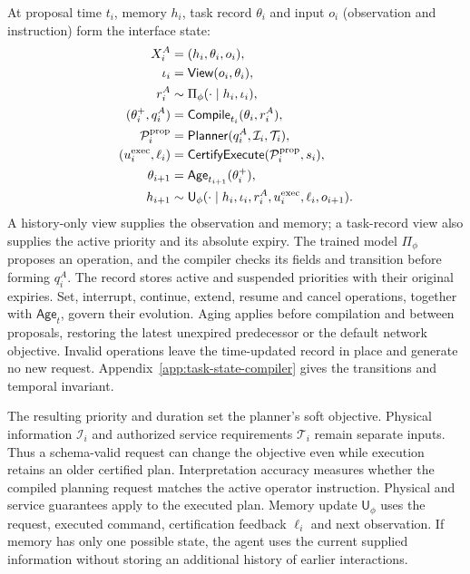 \documentclass[journal,10pt]{IEEEtran}
\newcommand{\appref}[1]{Appendix~\ref{#1}}
\begin{document}
At proposal time $t_i$, memory $h_i$, task record $\theta_i$ and input $o_i$
(observation and instruction) form the interface state:
\begin{equation}
\begin{aligned}
X_i^A&=(h_i,\theta_i,o_i),\\
\iota_i&=\mathsf{View}(o_i,\theta_i),\\
r_i^A&\sim\Pi_\phi(\cdot\mid h_i,\iota_i),\\
(\theta_i^+,q_i^A)&=\mathsf{Compile}_{t_i}(\theta_i,r_i^A),\\
\mathcal P_i^{\rm prop}
&=\mathsf{Planner}(q_i^A,\mathcal I_i,\mathcal T_i),\\
(u_i^{\rm exec},\ell_i)
&=\mathsf{CertifyExecute}(\mathcal P_i^{\rm prop},s_i),\\
\theta_{i+1}&=\mathsf{Age}_{t_{i+1}}(\theta_i^+),\\
h_{i+1}&\sim\mathsf U_\phi(\cdot\mid
h_i,\iota_i,r_i^A,u_i^{\rm exec},\ell_i,o_{i+1}).
\end{aligned}
\label{eq:new-agent-state}
\end{equation}
A history-only view supplies the observation and memory; a task-record view
also supplies the active priority and its absolute expiry. The trained model
$\Pi_\phi$ proposes an operation, and the compiler checks its fields and
transition before forming $q_i^A$. The record stores active and suspended
priorities with their original expiries. Set, interrupt, continue, extend,
resume and cancel operations, together with $\mathsf{Age}_t$, govern their
evolution. Aging applies before compilation and between proposals, restoring
the latest unexpired predecessor or the default network objective. Invalid
operations leave the time-updated record in place and generate no new request.
\appref{app:task-state-compiler} gives the transitions and temporal invariant.

The resulting priority and duration set the planner's soft objective.
Physical information $\mathcal I_i$ and authorized service requirements
$\mathcal T_i$ remain separate inputs. Thus a schema-valid request can
change the objective even while execution retains an older certified plan.
Interpretation accuracy measures whether the compiled planning request
matches the active operator instruction. Physical and service guarantees
apply to the executed plan. Memory update $\mathsf U_\phi$
uses the request, executed command, certification feedback $\ell_i$ and next
observation. If memory has only one possible state, the agent uses the current supplied
information without storing an additional history of earlier interactions.
\end{document}
